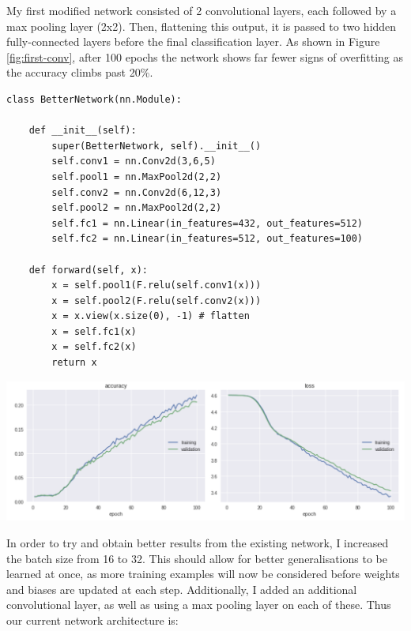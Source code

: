 \documentclass[11pt]{article}
\begin{document}
My first modified network consisted of 2 convolutional layers, each followed by a max pooling layer (2x2). Then, flattening this output, it is passed to two hidden fully-connected layers before the final classification layer. As shown in Figure \ref{fig:first-conv}, after 100 epochs the network shows far fewer signs of overfitting as the accuracy climbs past 20\%.

\begin{small}
\begin{verbatim}
class BetterNetwork(nn.Module):

    def __init__(self):
        super(BetterNetwork, self).__init__()
        self.conv1 = nn.Conv2d(3,6,5)
        self.pool1 = nn.MaxPool2d(2,2)
        self.conv2 = nn.Conv2d(6,12,3)
        self.pool2 = nn.MaxPool2d(2,2)
        self.fc1 = nn.Linear(in_features=432, out_features=512)
        self.fc2 = nn.Linear(in_features=512, out_features=100)

    def forward(self, x):
        x = self.pool1(F.relu(self.conv1(x)))
        x = self.pool2(F.relu(self.conv2(x)))
        x = x.view(x.size(0), -1) # flatten
        x = self.fc1(x)
        x = self.fc2(x)
        return x
\end{verbatim}
\end{small}


    \begin{center}
        \begin{minipage}{0.75\linewidth}
            \includegraphics[width=\linewidth]{accuracy1}
            \label{fig:first-conv}
        \end{minipage}%
    \end{center}


In order to try and obtain better results from the existing network, I increased the batch size from 16 to 32. This should allow for better generalisations to be learned at once, as more training examples will now be considered before weights and biases are updated at each step. Additionally, I added an additional convolutional layer, as well as using a max pooling layer on each of these. Thus our current network architecture is:
\end{document}
